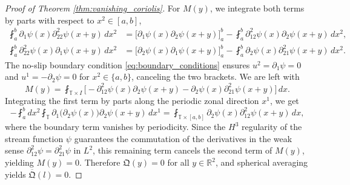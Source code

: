 \documentclass[11pt,a4paper]{article}
\numberwithin{equation}{section}
\numberwithin{theorem}{section}
\numberwithin{remark}{section}
\numberwithin{definition}{section}
\begin{document}
\begin{proof}[Proof of Theorem \ref{thm:vanishing_coriolis}]
For $M(y)$, we integrate both terms by parts with respect to $x^2 \in [a, b]$,
\begin{align*}
    \fint_a^b \partial_1 \psi(x) \partial_{22}^2 \psi(x+y) \, dx^2 &= \Big[ \partial_1 \psi(x) \partial_2 \psi(x+y)\Big]_{a}^{b} - \fint_a^b \partial_{12}^2 \psi(x) \partial_2 \psi(x+y) \, dx^2, \\
    \fint_a^b \partial_{22}^2 \psi(x) \partial_1 \psi(x+y) \, dx^2 &= \Big[ \partial_2 \psi(x) \partial_1 \psi(x+y) \Big]_{a}^{b} - \fint_a^b \partial_{2} \psi(x) \partial_{21}^2 \psi(x+y) \, dx^2.
\end{align*}
The no-slip boundary condition \eqref{eq:boundary_conditions} ensures $u^2 = \partial_1 \psi = 0$ and $u^1 = -\partial_2 \psi = 0$ for $x^2 \in \{a, b\}$, canceling the two brackets. We are left with
\begin{equation*}
    M(y) = \fint_{\mathbb{T} \times I} \big[ - \partial_{12}^2 \psi(x) \partial_2 \psi(x+y) - \partial_2 \psi(x) \partial_{21}^2 \psi(x+y) \big] \, dx.
\end{equation*}
Integrating the first term by parts along the periodic zonal direction $x^1$, we get 
\begin{equation*}
    - \fint_a^b dx^2 \fint_{\mathbb{T}} \partial_1 \big(\partial_2 \psi(x)\big) \partial_2 \psi(x+y) \, dx^1 = \fint_{\mathbb{T} \times [a, b]} \partial_2 \psi(x) \partial_{12}^2 \psi(x+y) \, dx,
\end{equation*}
where the boundary term vanishes by periodicity. Since the $H^3$ regularity of the stream function $\psi$ guarantees the commutation of the derivatives in the weak sense $\partial_{12}^2 \psi = \partial_{21}^2 \psi$ in $L^2$, this remaining term cancels the second term of $M(y)$, yielding $M(y) = 0$. Therefore $\mathfrak{Q}(y)=0$ for all $y\in \mathbb{R}^2$, and spherical averaging yields $\overline{\mathfrak{Q}}(l)=0$. 

\text{}





\end{proof}
\end{document}
